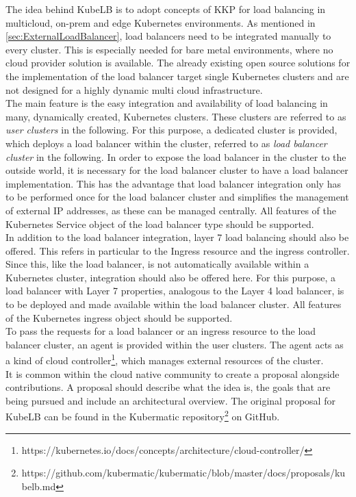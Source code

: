 The idea behind KubeLB is to adopt concepts of KKP for load balancing in multicloud, on-prem and edge Kubernetes environments.
As mentioned in \autoref{sec:ExternalLoadBalancer}, load balancers need to be integrated manually to every cluster.
This is especially needed for bare metal environments, where no cloud provider solution is available.
The already existing open source solutions for the implementation of the load balancer target single Kubernetes clusters and are not designed for a highly dynamic multi cloud infrastructure.
\\
The main feature is the easy integration and availability of load balancing in many, dynamically created, Kubernetes clusters.
These clusters are referred to as \textit{user clusters} in the following.
For this purpose, a dedicated cluster is provided, which deploys a load balancer within the cluster, referred to as \textit{load balancer cluster} in the following.
In order to expose the load balancer in the cluster to the outside world, it is necessary for the load balancer cluster to have a load balancer implementation.
This has the advantage that load balancer integration only has to be performed once for the load balancer cluster and simplifies the management of external IP addresses, as these can be managed centrally.
All features of the Kubernetes Service object of the load balancer type should be supported.
\\
In addition to the load balancer integration, layer 7 load balancing should also be offered.
This refers in particular to the Ingress resource and the ingress controller.
Since this, like the load balancer, is not automatically available within a Kubernetes cluster, integration should also be offered here.
For this purpose, a load balancer with Layer 7 properties, analogous to the Layer 4 load balancer, is to be deployed and made available within the load balancer cluster.
All features of the Kubernetes ingress object should be supported.
\\
To pass the requests for a load balancer or an ingress resource to the load balancer cluster, an agent is provided within the user clusters.
The agent acts as a kind of cloud controller\footnote{https://kubernetes.io/docs/concepts/architecture/cloud-controller/}, which manages external resources of the cluster.
\\
It is common within the cloud native community to create a proposal alongside contributions.
A proposal should describe what the idea is, the goals that are being pursued and include an architectural overview.
The original proposal for KubeLB can be found in the Kubermatic repository\footnote{https://github.com/kubermatic/kubermatic/blob/master/docs/proposals/kubelb.md} on GitHub.
